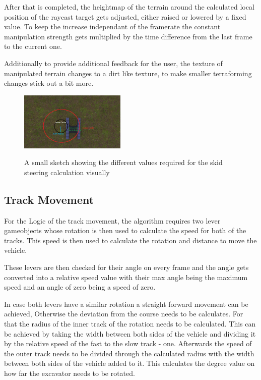 \documentclass[journal]{vgtc}                     %
\begin{document}
After that is completed, the heightmap of the terrain around the calculated local position of the raycast target gets adjusted, either raised or lowered by a fixed value. To keep the increase independant of the framerate the constant manipulation strength gets multiplied by the time difference from the last frame to the current one.

Additionally to provide additional feedback for the user, the texture of manipulated terrain changes to a dirt like texture, to make smaller terraforming changes stick out a bit more.

\begin{figure}[h]%
  \centering %
  \includegraphics[width=0.45\textwidth, alt={A Top-Down View of the track base of the excavator with a few circles and radius showing the different values required for calculating the skid steering rotation}]{TrackBase}
  \caption{%
  	A small sketch showing the different values required for the skid steering calculation visually%
  }
  \label{fig:skid_steering_sketch}
\end{figure}
\subsection{Track Movement}

For the Logic of the track movement, the algorithm requires two lever gameobjects whose rotation is then used to calculate the speed for both of the tracks. This speed is then used to calculate the rotation and distance to move the vehicle.

These levers are then checked for their angle on every frame and the angle gets converted into a relative speed value with their max angle being the maximum speed and an angle of zero being a speed of zero.

In case both levers have a similar rotation a straight forward movement can be achieved, Otherwise the deviation from the course needs to be calculates. For that the radius of the inner track of the rotation needs to be calculated. This can be achieved by taking the width between both sides of the vehicle and dividing it by the relative speed of the fast to the slow track - one. Afterwards the speed of the outer track needs to be divided through the calculated radius with the width between both sides of the vehicle added to it. This calculates the degree value on how far the excavator needs to be rotated.
\end{document}
